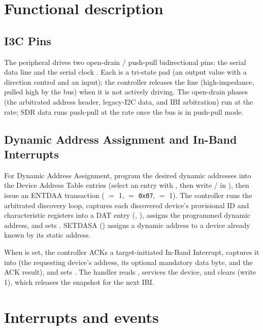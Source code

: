 \section{Functional description}

\subsection{I3C Pins}

The  peripheral drives two open-drain / push-pull bidirectional pins: the serial data line  and the serial clock . Each is a tri-state pad (an output value with a direction control and an input); the controller releases the line (high-impedance, pulled high by the bus) when it is not actively driving. The open-drain phases (the arbitrated address header, legacy-I2C data, and IBI arbitration) run at the  rate; SDR data runs push-pull at the  rate once the bus is in push-pull mode.

\subsection{Dynamic Address Assignment and In-Band Interrupts}

For Dynamic Address Assignment, program the desired dynamic addresses into the Device Address Table entries (select an entry with , then write  /  in ), then issue an ENTDAA transaction ( $=$ 1,  $=$ \texttt{0x07},  $=$ 1). The controller runs the arbitrated discovery loop, captures each discovered device's provisional ID and characteristic registers into a DAT entry (, ), assigns the programmed dynamic address, and sets . SETDASA () assigns a dynamic address to a device already known by its static address.

When  is set, the controller ACKs a target-initiated In-Band Interrupt, captures it into  (the requesting device's address, its optional mandatory data byte, and the ACK result), and sets . The handler reads , services the device, and clears  (write 1), which releases the snapshot for the next IBI.

\section{Interrupts and events}

